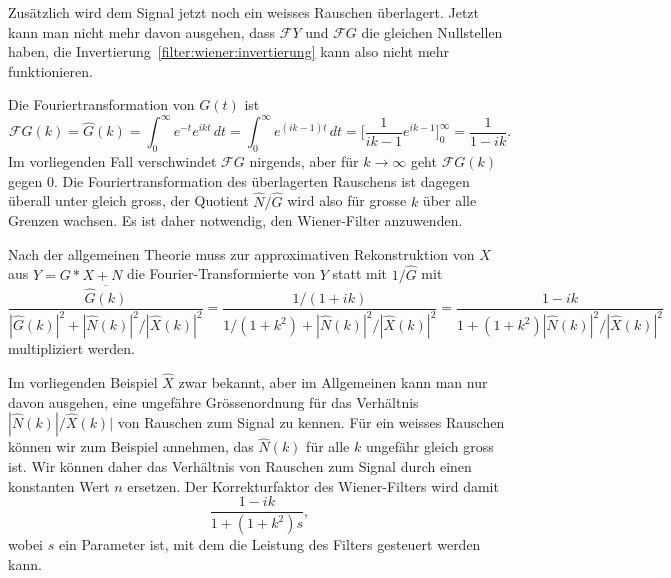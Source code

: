 Zusätzlich wird dem Signal jetzt noch ein weisses Rauschen überlagert.
Jetzt kann man nicht mehr davon ausgehen, dass $\mathcal{F}Y$ und 
$\mathcal{F}G$ die gleichen Nullstellen haben, die 
Invertierung~\eqref{filter:wiener:invertierung} kann also nicht
mehr funktionieren.

Die Fouriertransformation von $G(t)$ ist
\begin{equation}
\mathcal{F}G(k)
=
\hat{G}(k)
=
\int_0^\infty e^{-t} e^{ikt}\,dt
=
\int_0^\infty e^{(ik-1)t}\,dt
=
\biggl[\frac{1}{ik-1}e^{ik-1}\biggr]_0^\infty
=
\frac{1}{1-ik}.
\end{equation}
Im vorliegenden Fall verschwindet $\mathcal{F}G$ nirgends, aber
für $k\to\infty$ geht $\mathcal{F}G(k)$ gegen $0$.
Die Fouriertransformation des überlagerten Rauschens ist dagegen überall
unter gleich gross, der Quotient $\hat{N}/\hat{G}$ wird also für
grosse $k$ über alle Grenzen wachsen.
Es ist daher notwendig, den Wiener-Filter anzuwenden.

Nach der allgemeinen Theorie muss zur approximativen Rekonstruktion
von $X$ aus $Y=G*X+N$ die Fourier-Transformierte von $Y$ statt mit
$1/\hat{G}$ mit
\[
\frac{\overline{\hat{G}(k)}}{
|\hat{G}(k)|^2
+
|\hat{N}(k)|^2/|\hat{X}(k)|^2
}
=
\frac{1/(1+ik)}{
1/(1+k^2)
+
|\hat{N}(k)|^2/|\hat{X}(k)|^2
}
=
\frac{1-ik}{1+(1+k^2) |\hat{N}(k)|^2/|\hat{X}(k)|^2}
\]
multipliziert werden.

Im vorliegenden Beispiel $\hat{X}$ zwar bekannt, aber im Allgemeinen
kann man nur davon ausgehen, eine ungefähre Grössenordnung für das
Verhältnis $|\hat{N}(k)|/\hat{X}(k)|$ von Rauschen zum Signal
zu kennen.
Für ein weisses Rauschen können wir zum Beispiel annehmen, das $\hat{N}(k)$
für alle $k$ ungefähr gleich gross ist.
Wir können daher das Verhältnis von Rauschen zum Signal durch einen
konstanten Wert $n$ ersetzen.
Der Korrekturfaktor des Wiener-Filters wird damit
\[
\frac{1-ik}{1+(1+k^2) s},
\]
wobei $s$ ein Parameter ist, mit dem die Leistung des Filters gesteuert
werden kann.

